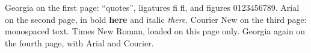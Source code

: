\documentclass{article}
\begin{document}
Georgia on the first page: “quotes”, ligatures fi fl, and figures 0123456789.
\newpage
{\arial Arial on the second page, in bold \textbf{here} and italic \textit{there}.}
\newpage
{\courier Courier New on the third page: monospaced text.}
{ Times New Roman, loaded on this page only.}
\newpage
Georgia again on the fourth page, {\arial with Arial} and {\courier Courier}.
\end{document}
